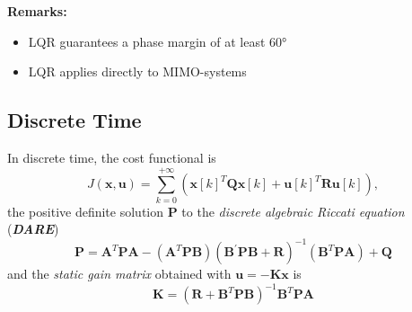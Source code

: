 \textbf{Remarks:}

\begin{itemize}
    \item LQR guarantees a phase margin of at least 60°
    \item LQR applies directly to MIMO-systems
\end{itemize}

\newpar{}
\textbf{} 


\subsection{Discrete Time}
In discrete time, the cost functional is
\noindent\begin{equation*}
    J(\mathbf{x,u})=\sum_{k=0}^{+\infty}\left({\mathbf{x}[k]}^T \mathbf{Qx}[k]+{\mathbf{u}[k]}^T \mathbf{Ru}[k]\right),
\end{equation*}
the positive definite solution $\mathbf{P}$ to the \textit{discrete algebraic Riccati equation} (\textbf{\textit{DARE}})
\noindent\begin{equation*}
    \mathbf{P}=\mathbf{A}^T \mathbf{PA}-(\mathbf{A}^T \mathbf{PB}){(\mathbf{B}^{\prime}\mathbf{PB}+\mathbf{R})}^{-1}(\mathbf{B}^T \mathbf{PA})+\mathbf{Q}
\end{equation*}
and the \textit{static gain matrix} obtained with $\mathbf{u} = -\mathbf{Kx}$ is
\noindent\begin{equation*}
    \mathbf{K}={(\mathbf{R}+\mathbf{B}^T \mathbf{PB})}^{-1}\mathbf{B}^T \mathbf{PA}
\end{equation*}

\textbf{} 

